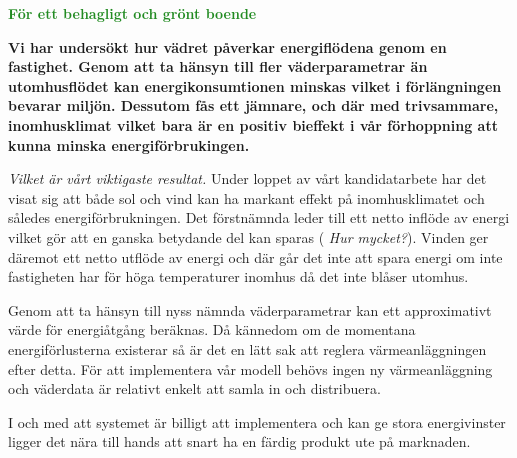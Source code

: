 \documentclass[11pt,a4paper]{article}
\begin{document}
\addtolength{\parindent}{-0.6 cm}
\pagestyle{fancy}
\rhead{\sc\footnotesize \today}
\mbox{}

\begin{center}
\textcolor{ForestGreen}{\textbf{\Huge För ett behagligt och grönt boende}}
\end{center}

\mbox{}

\setlength{\columnsep}{5mm}
\begin{multicols}{2}
\addtolength{\parskip}{1.3ex}
\normalsize

\textbf{Vi har undersökt hur vädret påverkar energiflödena genom en fastighet. Genom att ta hänsyn till fler väderparametrar än utomhusflödet kan energikonsumtionen minskas vilket i förlängningen bevarar miljön. Dessutom fås ett jämnare, och där med trivsammare, inomhusklimat vilket bara är en positiv bieffekt i vår förhoppning att kunna minska energiförbrukingen.}

\emph{\color{red} Vilket är vårt viktigaste resultat.}
Under loppet av vårt kandidatarbete har det visat sig att både sol och vind kan
ha markant effekt på inomhusklimatet och således energiförbrukningen. Det 
förstnämnda leder till ett netto inflöde av energi vilket gör att en ganska
betydande del kan sparas (\emph{\color{red} Hur mycket?}). Vinden
ger däremot ett netto utflöde av energi och där går det inte att spara energi
om inte fastigheten har för höga temperaturer inomhus då det inte blåser utomhus.

Genom att ta hänsyn till nyss nämnda väderparametrar kan ett approximativt
värde för energiåtgång beräknas. Då kännedom om de momentana energiförlusterna
existerar så är det en lätt sak att reglera värmeanläggningen efter detta.
För att implementera vår modell behövs ingen ny värmeanläggning och väderdata är relativt enkelt att samla in och distribuera. 

\begin{comment}
Är man en liten bostadsrättsförening eller bo i villa kanske man tycker att väderstationen är en stor utgift – då kan man gå ihop några grannar och samla in väderdata gemensamt.\end{comment}

I och med att systemet är billigt att implementera och kan ge stora energivinster ligger det nära till hands att snart ha en färdig produkt ute på marknaden.


\end{multicols}
\end{document}
